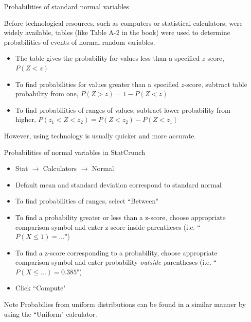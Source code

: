 \documentclass[xcolor=table]{beamer}
\begin{document}
\begin{frame}{Probabilities of standard normal variables}
\begin{block}{}
Before technological resources, such as computers or statistical calculators, were widely available, tables (like Table A-2 in the book) were used to determine probabilities of events of normal random variables.
\begin{itemize}
\pause\item The table gives the probability for values less than a specified $z$-score, $P(Z < z)$
\pause\item To find probabilities for values greater than a specified $z$-score, subtract table probability from one, $P(Z > z) = 1-P(Z<z)$
\pause\item To find probabilities of ranges of values, subtract lower probability from higher, $P(z_1 < Z < z_2) = P(Z < z_2) - P(Z < z_1)$
\end{itemize}
\medskip
\pause However, using technology is usually quicker and more accurate.
\end{block}
\end{frame}

\begin{frame}{Probabilities of normal variables in StatCrunch}
\begin{block}{}
\begin{itemize}
\item Stat $\to$ Calculators $\to$ Normal
\item Default mean and standard deviation correspond to standard normal
\item To find probabilities of ranges, select ``Between"
\item To find a probability greater or less than a z-score, choose appropriate comparison symbol and enter z-score inside parentheses (i.e. ``$P(X \le 1) =\ldots$")
\item To find a z-score corresponding to a probability, choose appropriate comparison symbol and enter probability \emph{outside} parentheses (i.e. ``$P(X \le \ldots) = 0.385$")
\item Click ``Compute"
\end{itemize}
\end{block}

\begin{alertblock}{Note}
Probabilies from uniform distributions can be found in a similar manner by using the ``Uniform" calculator.
\end{alertblock}
\end{frame}
\end{document}
